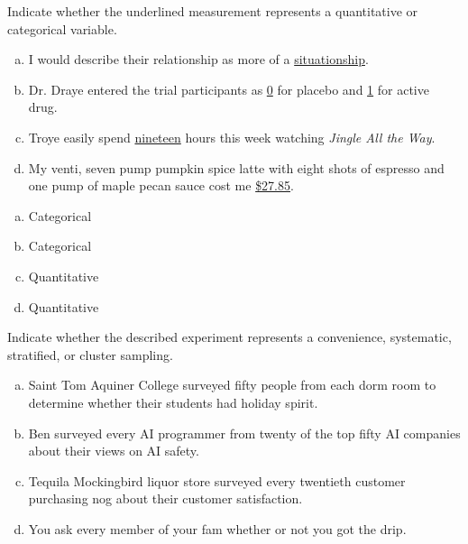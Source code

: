 \documentclass[12pt,letterpaper]{exam}
\begin{document}
\examtitle
{} 
\scores
\bottomline
\newpage

\begin{questions}

\newpage
\question[10] Indicate whether the underlined measurement represents a quantitative or categorical variable.
	\begin{enumerate}[(a)]
	\item I would describe their relationship as more of a \underline{situationship}. 
	\item Dr. Draye entered the trial participants as \underline{0} for placebo and \underline{1} for active drug. 
	\item Troye easily spend \underline{nineteen} hours this week watching \textit{Jingle All the Way}. 
	\item My venti, seven pump pumpkin spice latte with eight shots of espresso and one pump of maple pecan sauce cost me \underline{\$27.85}. 
	\end{enumerate} \pspace

\sol 
\begin{enumerate}[(a)]
\item Categorical \pspace

\item Categorical \pspace

\item Quantitative \pspace

\item Quantitative 
\end{enumerate}



\newpage
\question[10] Indicate whether the described experiment represents a convenience, systematic, stratified, or cluster sampling. 
	\begin{enumerate}[(a)]
	\item Saint Tom Aquiner College surveyed fifty people from each dorm room to determine whether their students had holiday spirit. 
	\item Ben surveyed every AI programmer from twenty of the top fifty AI companies about their views on AI safety. 
	\item Tequila Mockingbird liquor store surveyed every twentieth customer purchasing nog about their customer satisfaction.  
	\item You ask every member of your fam whether or not you got the drip. 
	\end{enumerate} \pspace


\end{questions}
\end{document}
